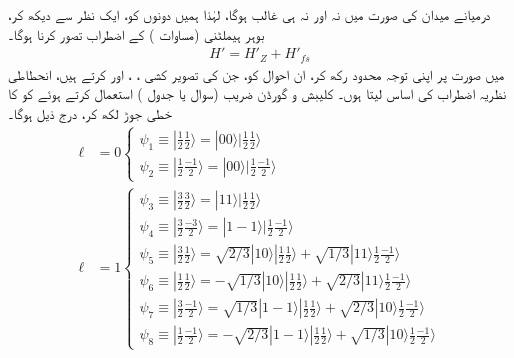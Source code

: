 درمیانے میدان کی صورت میں نہ  اور نہ ہی  غالب ہوگا، لہٰذا ہمیں دونوں کو، ایک نظر سے دیکھ کر، بوہر ہیملٹنی (مساوات ) کے اضطراب تصور کرنا ہوگا۔
\begin{align}
H' = H'_Z + H'_{fs}
\end{align}
میں  صورت پر اپنی توجہ محدود رکھ کر، ان احوال کو، جن کی تصویر کشی ، ، اور  کرتے ہیں، انحطاطی نظریہ اضطراب کی اساس لیتا ہوں۔ کلیبش و گورڈن  ضریب  (سوال  یا جدول  ) استعمال کرتے ہوئے  کو 
 کا خطی جوڑ لکھ کر، درج ذیل ہوگا۔
\begin{align*}
\ell &= 0
\begin{cases}
\psi_1 \equiv | \frac{1}{2} \frac{1}{2} \rangle = | 00 \rangle | \frac{1}{2} \frac{1}{2} \rangle \\
\psi_2 \equiv | \frac{1}{2} \frac{-1}{2} \rangle = | 00 \rangle | \frac{1}{2} \frac{-1}{2} \rangle
\end{cases} \\
\ell &= 1
\begin{cases}
\psi_3 \equiv | \frac{3}{2} \frac{3}{2} \rangle = | 11 \rangle | \frac{1}{2} \frac{1}{2} \rangle \\
\psi_4 \equiv | \frac{3}{2} \frac{-3}{2} \rangle = | 1 - 1 \rangle | \frac{1}{2} \frac{-1}{2} \rangle \\
\psi_5 \equiv | \frac{3}{2} \frac{1}{2} \rangle = \sqrt{2/3}| 10 \rangle | \frac{1}{2} \frac{1}{2} \rangle + \sqrt{1/3} | 11 \rangle \frac{1}{2} \frac{-1}{2} \rangle \\
\psi_6 \equiv | \frac{1}{2} \frac{1}{2} \rangle = - \sqrt{1/3} | 10 \rangle | \frac{1}{2} \frac{1}{2} \rangle + \sqrt{2/3} | 11 \rangle \frac{1}{2} \frac{-1}{2} \rangle \\
\psi_7 \equiv | \frac{3}{2} \frac{-1}{2} \rangle = \sqrt{1/3} | 1 - 1 \rangle | \frac{1}{2} \frac{1}{2} \rangle + \sqrt{2/3} | 10 \rangle \frac{1}{2} \frac{-1}{2} \rangle \\
\psi_8 \equiv | \frac{1}{2} \frac{-1}{2} \rangle = - \sqrt{2/3} | 1 - 1 \rangle | \frac{1}{2} \frac{1}{2} \rangle + \sqrt{1/3} | 10 \rangle \frac{1}{2} \frac{-1}{2} \rangle
\end{cases}
\end{align*}

